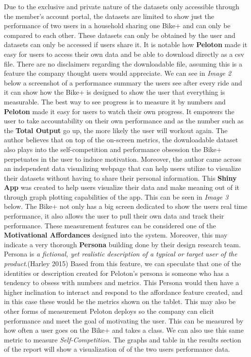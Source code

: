 \documentclass[
]{article}
\begin{document}
Due to the exclusive and private nature of the datasets only accessible through the member's account portal, the datasets are limited to show just the performance of two users in a household sharing one Bike+ and can only be compared to each other. These datasets can only be obtained by the user and datasets can only be accessed if users share it. It is notable how \textbf{Peloton} made it easy for users to access their own data and be able to download directly as a csv file. There are no disclaimers regarding the downloadable file, assuming this is a feature the company thought users would appreciate. We can see in \emph{Image 2} below a screenshot of a performance summary the users see after every ride and it can show how the Bike+ is designed to show the user that everything is measurable. The best way to see progress is to measure it by numbers and \textbf{Peloton} made it easy for users to watch their own progress. It empowers the user to take accountability on their own performance and as the number such as the \textbf{Total Output} go up, the more likely the user will workout again. The author believes that on top of the on-screen metrics, the downloadable dataset also plays into the self-competition and performance obsession the Bike+ perpetuates in the user to induce motivation. Moreover, the author came across an independent data visualizing webpage that can help users utilize to visualize their datasets without having to share their personal information. This \textbf{Shiny App} was created to help users visualize their data and make meaning out of it through graph plotting capabilities of the app. This can be seen in \emph{Image 3} below. The Bike+ not only has a big screen dedicated to show the users real time performance, it also allows the user to pull their own data and track their performance. These measurement features can be considered one of the \textbf{Motivational Affordances} designed into the system. Moreover, this may indicate a very thorough \textbf{Persona} building done by their design research team. Persona is \emph{a fictional, yet realistic description of a typical or target user of the product}.(Harley 2015) Based from this feature, we can speculate that one of the identities or description created for Peloton's persona is someone who has a tendency to obsess with numbers and metrics. This Persona would then have a higher inclination to interact and respond to the affordance feature created, and in this case these would be the metrics shown on the tablet. This may also be other forms of measurement Peloton deploys so the company can elicit performance and meet the goal of motivating the user. This can be measured by how often a user goes on the Bike+ and takes a class. We can also use this same metric to measure \emph{Self-Competition}. The graphs and table in the results section of the report will show a visualization of of the two users performance data.
\end{document}
